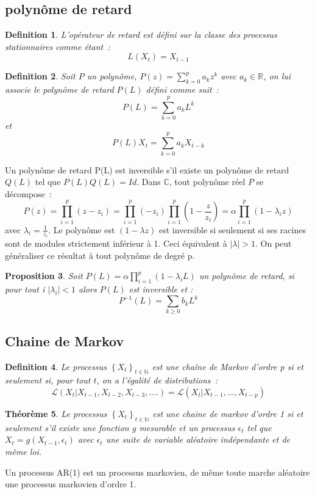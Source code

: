 \documentclass[11pt]{scrartcl} %
\newtheorem{theorem}{Théorème}[section]
\newtheorem{Def}[theorem]{Definition}
\newtheorem{pro}[theorem]{Proposition}
\begin{document}
\subsection{polynôme de retard}
\begin{Def}
L'opérateur de retard est défini sur la classe des processus stationnaires comme étant~: 
$$
L(X_t)=X_{t-1}
$$
\end{Def}
\begin{Def}
Soit $P$ un polynôme, $P(z)=\sum_{k=0}^{p}a_kz^k$ avec $a_k\in\mathbb{R}$, on lui associe le polynôme de retard $P(L)$ défini comme suit~:
$$
P(L)=\sum_{k=0}^pa_kL^k
$$
et 
$$
P(L)X_t=\sum_{k=0}^pa_kX_{t-k}
$$
\end{Def}
Un polynôme de retard P(L) est inversible s'il existe un polynôme de retard $Q(L)$ tel que $P(L)Q(L)=Id$. Dans $\mathbb{C}$, tout polynôme réel $P$ se décompose~:
$$
P(z)=\prod_{i=1}^p(z-z_i)=\prod_{i=1}^p(-z_i)\prod_{i=1}^p(1-\frac{z}{z_i})=\alpha\prod_{i=1}^p(1-\lambda_i z)
$$
avec $\lambda_i=\frac{1}{z_i}$.
Le polynôme est $(1-\lambda z)$ est inversible si seulement si ses racines sont de modules strictement inférieur à 1. Ceci équivalent à $|\lambda|>1$. On peut généraliser ce résultat à tout polynôme de degré p.
\begin{pro}
Soit $P(L) = \alpha\prod_{i=1}^p(1-\lambda_i L)$ un polynôme de retard, si pour tout i $|\lambda_i|<1$ alors $P(L)$ est inversible et :
$$
P^{-1}(L)= \sum_{k\geq 0}b_kL^k
$$
\end{pro}

\subsection{Chaine de Markov}
\begin{Def}
Le processus $\left\{X_t\right\}_{t\in\mathbb{N}}$ est une chaîne de Markov d'ordre p si et seulement si, pour tout $t$, on a l'égalité de distributions~:
$$
\mathcal{L}\left(X_t|X_{t-1},X_{t-2},X_{t-3},....\right) = \mathcal{L}\left(X_t|X_{t-1},...,X_{t-p}\right)
$$
\end{Def}
\begin{theorem}
Le processus $\left\{X_t\right\}_{t\in\mathbb{N}}$ est une chaine de markov d'ordre 1 si et seulement s'il existe une fonction $g$ mesurable et un processus $\epsilon_t$ tel que $X_t=g(X_{t-1},\epsilon_t)$ avec $\epsilon_t$ une suite de variable aléatoire indépendante et de même loi.
\end{theorem}
Un processus AR(1) est un processus markovien, de même toute marche aléatoire une processus markovien d'ordre 1.
\end{document}
